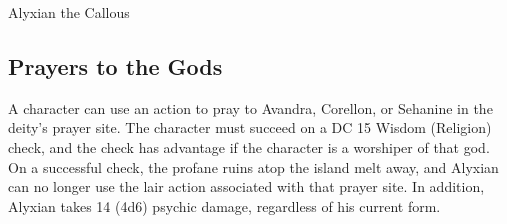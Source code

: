 \documentclass[10pt,a4paper,twoside,twocolumn,openany,nodeprecatedcode]{dndbook}
\begin{document}
\begin{DndMonster}[float=ht]{Alyxian the Callous}
\begin{description}[nolistsep]
\end{description}

\subsection{Prayers to the Gods}
A character can use an action to pray to Avandra, Corellon, or Sehanine in the deity's prayer site. The character must succeed on a DC 15 Wisdom (Religion) check, and the check has advantage if the character is a worshiper of that god. On a successful check, the profane ruins atop the island melt away, and Alyxian can no longer use the lair action associated with that prayer site. In addition, Alyxian takes 14 (4d6) psychic damage, regardless of his current form.

\end{DndMonster}


\clearpage
{}
\end{document}
